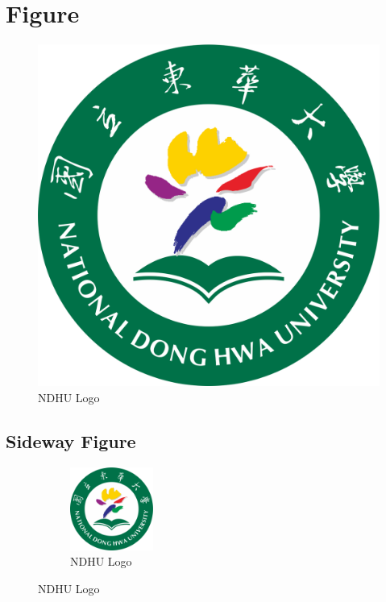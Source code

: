 \documentclass[12pt,a4paper,oneside]{book}
\begin{document}
\section{Figure}
\begin{figure}[H]
     \centering
     \includegraphics[width=1\textwidth]{NDHU_logo.png}
     \caption{NDHU Logo}
     \label{fig: ndhulogo}
\end{figure}

\newpage
\subsection{Sideway Figure}
\label{fig: sideways}

\begin{figure}
\begin{figure}[H]
     \centering
     \includegraphics[width=0.3\textwidth]{NDHU_logo.png}
     \caption{NDHU Logo}
\end{figure}
\end{figure}
\end{document}

